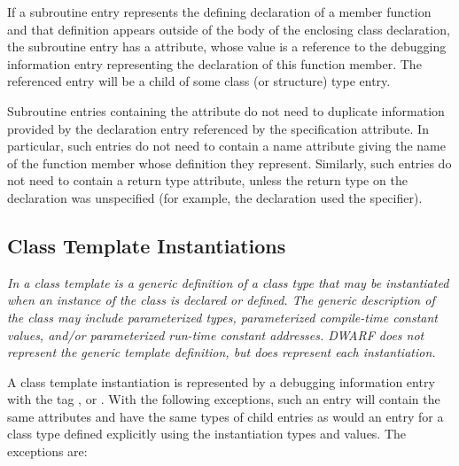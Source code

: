 If a subroutine entry represents the defining declaration
of a member function and that definition appears outside of
the body of the enclosing class declaration, the subroutine
entry has a 
\DWATspecification{} attribute, 
whose value is
a reference to the debugging information entry representing
the declaration of this function member. The referenced entry
will be a child of some class (or structure) type entry.

Subroutine entries containing the
\DWATspecification{} attribute 
do not need to duplicate information provided
by the declaration entry referenced by the specification
attribute. In particular, such entries do not need to contain
a name attribute giving the name of the function member whose 
definition they represent.  
Similarly, such entries do not need to contain a return type attribute, 
unless the return type on the declaration was unspecified (for example, the 
declaration used the   specifier).

\subsection{Class Template Instantiations}
\label{chap:classtemplateinstantiations}

\textit{In  a class template is a generic definition of a class
type that may be instantiated when an instance of the class
is declared or defined. The generic description of the class may include
parameterized types, parameterized compile-time constant
values, and/or parameterized run-time constant addresses. 
DWARF does not represent the generic template
definition, but does represent each instantiation.}

A class template instantiation is represented by a
debugging information entry with the tag \DWTAGclasstype,
\DWTAGstructuretype{} or 
\DWTAGuniontype. With the following
exceptions, such an entry will contain the same attributes
and have the same types of child entries as would an entry
for a class type defined explicitly using the instantiation
types and values. The exceptions are:

